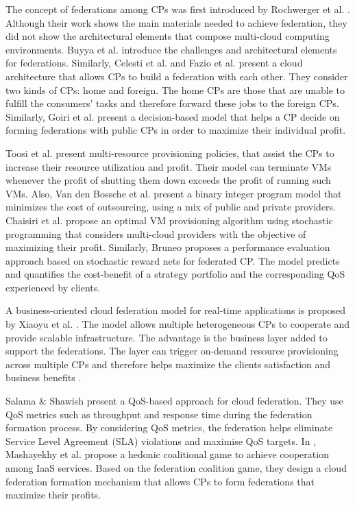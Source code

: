 \documentclass[preprint]{elsarticle}
\theoremstyle{definition}
\theoremstyle{remark}
\theoremstyle{property}
\begin{document}
The concept of federations among CPs was first introduced
by Rochwerger et al. \cite{rochwerger2011reservoir}. Although their work
shows the main materials needed to achieve federation, they
did not show the architectural elements that compose multi-cloud
computing environments. Buyya et al. \cite{buyya2010intercloud} introduce the
challenges and architectural elements for federations. Similarly,
Celesti et al. \cite{celesti2010enhance} and Fazio et al. \cite{fazio2015enhance} present a cloud architecture
that allows CPs to build a federation with each other. They consider two kinds of CPs: home
and foreign. The home CPs are those that
are unable to fulfill the consumers' tasks and therefore
forward these jobs to the foreign CPs. Similarly, Goiri et al. \cite{goiri2010characterizing} present
a decision-based model that helps a CP
decide on forming federations with public CPs in
order to maximize their individual profit.

Toosi et al. \cite{toosi2011resource} present multi-resource provisioning
policies, that assist the CPs to increase their resource
utilization and profit. Their model can terminate VMs whenever the profit of shutting them down exceeds
the profit of running such VMs. Also, Van den Bossche et
al. \cite{van2010cost} present a binary integer program model that
minimizes the cost of outsourcing, using a mix of public
and private providers. Chaisiri et al. \cite{chaisiri2012optimization} propose an
optimal VM provisioning algorithm using stochastic programming
that considers multi-cloud providers with the
objective of maximizing their profit. Similarly, Bruneo
\cite{bruneo2014stochastic} proposes a performance evaluation approach based on
stochastic reward nets for federated CP. The model
predicts and quantifies the cost-benefit of a strategy portfolio
and the corresponding QoS experienced by clients.

A business-oriented cloud federation model for real-time applications is proposed by Xiaoyu
et al. \cite{yang2012business}. The model allows multiple heterogeneous CPs to cooperate and provide
scalable infrastructure. The advantage is the business layer added to
support the federations. The layer can trigger on-demand resource provisioning across
multiple CPs and therefore helps maximize the clients satisfaction and business benefits \cite{yang2012business}.

Salama \& Shawish \cite{salama2014qos} present a QoS-based approach for cloud federation. They use QoS metrics
such as throughput and response time during the federation formation process. By considering QoS metrics, the federation helps eliminate Service Level Agreement (SLA) violations and maximise QoS targets.
In \cite{mashayekhy2015cloud}, Mashayekhy et al. propose a hedonic coalitional
game to achieve cooperation among IaaS services.
Based on the federation coalition game, they design a
cloud federation formation mechanism that allows
CPs to form federations that maximize their
profits.
\end{document}
